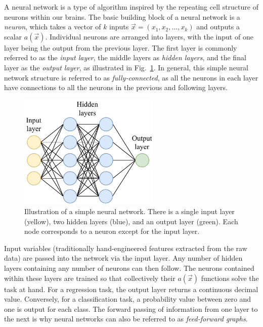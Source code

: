 A neural network is a type of algorithm inspired by the repeating cell structure of neurons within
our brains. The basic building block of a neural network is a \emph{neuron}, which takes a vector
of $k$ inputs $\vec{x}=(x_{1}, x_{2},\dots,x_{k})$ and outputs a scalar $a(\vec{x})$. Individual
neurons are arranged into layers, with the input of one layer being the output from the previous
layer. The first layer is commonly referred to as the \emph{input layer}, the middle layers as
\emph{hidden layers}, and the final layer as the \emph{output layer}, as illustrated in
Fig.~\ref{fig:network}. In general, this simple neural network structure is referred to as
\emph{fully-connected}, as all the neurons in each layer have connections to all the neurons in
the previous and following layers.

\begin{figure} %
    \includegraphics[width=0.6\textwidth]{diagrams/6-cnn/network.pdf}
    \caption[Illustration of a simple neural network]
    {Illustration of a simple neural network. There is a single input layer (yellow), two hidden
        layers (blue), and an output layer (green). Each node corresponds to a neuron except for
        the input layer.}
    \label{fig:network}
\end{figure}

Input variables (traditionally hand-engineered features extracted from the raw data) are passed
into the network via the input layer. Any number of hidden layers containing any number of neurons
can then follow. The neurons contained within these layers are trained so that collectively their
$a(\vec{x})$ functions solve the task at hand. For a regression task, the output layer returns a
continuous decimal value. Conversely, for a classification task, a probability value between zero
and one is output for each class. The forward passing of information from one layer to the next is
why neural networks can also be referred to as \emph{feed-forward graphs}.

